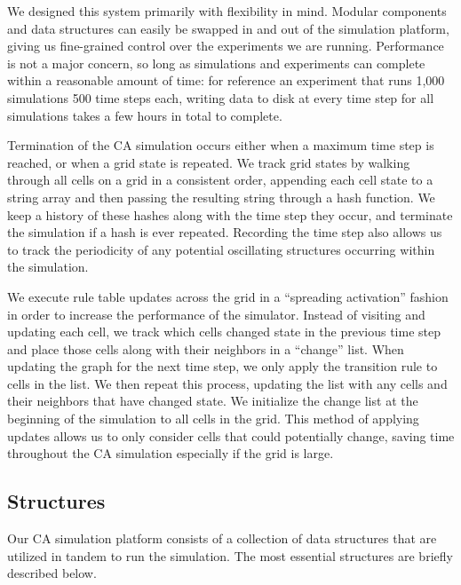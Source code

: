 \documentclass[a4paper,11pt]{report}
\begin{document}
We designed this system primarily with flexibility in mind. Modular components and data structures can easily be swapped in and out of the simulation platform, giving us fine-grained control over the experiments we are running. Performance is not a major concern, so long as simulations and experiments can complete within a reasonable amount of time: for reference an experiment that runs 1,000 simulations 500 time steps each, writing data to disk at every time step for all simulations takes a few hours in total to complete.


Termination of the CA simulation occurs either when a maximum time step is reached, or when a grid state is repeated. We track grid states by walking through all cells on a grid in a consistent order, appending each cell state to a string array and then passing the resulting string through a hash function. We keep a history of these hashes along with the time step they occur, and terminate the simulation if a hash is ever repeated. Recording the time step also allows us to track the periodicity of any potential oscillating structures occurring within the simulation.

We execute rule table updates across the grid in a ``spreading activation'' fashion in order to increase the performance of the simulator. Instead of visiting and updating each cell, we track which cells changed state in the previous time step and place those cells along with their neighbors in a ``change'' list. When updating the graph for the next time step, we only apply the transition rule to cells in the list. We then repeat this process, updating the list with any cells and their neighbors that have changed state. We initialize the change list at the beginning of the simulation to all cells in the grid. This method of applying updates allows us to only consider cells that could potentially change, saving time throughout the CA simulation especially if the grid is large. 

\subsection{Structures}
Our CA simulation platform consists of a collection of data structures that are utilized in tandem to run the simulation. The most essential structures are briefly described below.
\end{document}
